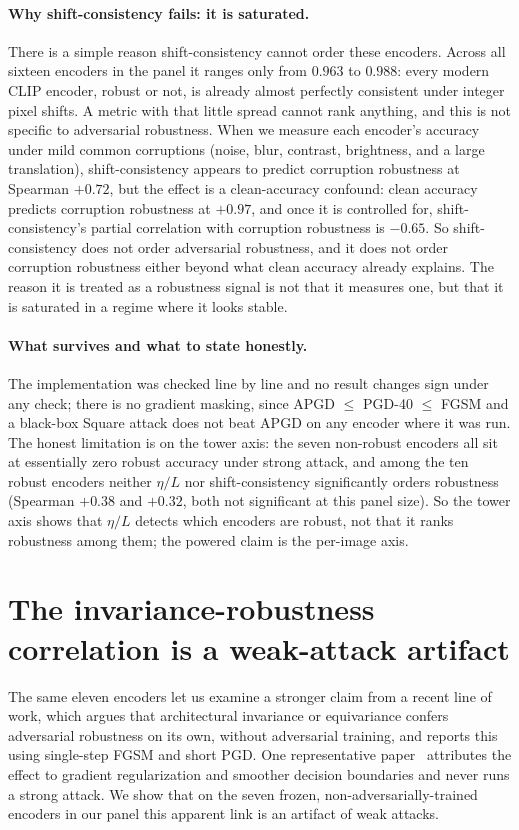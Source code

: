 \documentclass{article}
\newcommand{\etaL}{\ensuremath{\eta/L}}
\begin{document}
\paragraph{Why shift-consistency fails: it is saturated.}
There is a simple reason shift-consistency cannot order these encoders. Across all sixteen encoders in
the panel it ranges only from $0.963$ to $0.988$: every modern CLIP encoder, robust or not, is already
almost perfectly consistent under integer pixel shifts. A metric with that little spread cannot rank
anything, and this is not specific to adversarial robustness. When we measure each encoder's accuracy
under mild common corruptions (noise, blur, contrast, brightness, and a large translation),
shift-consistency appears to predict corruption robustness at Spearman $+0.72$, but the effect is a
clean-accuracy confound: clean accuracy predicts corruption robustness at $+0.97$, and once it is
controlled for, shift-consistency's partial correlation with corruption robustness is $-0.65$. So
shift-consistency does not order adversarial robustness, and it does not order corruption robustness
either beyond what clean accuracy already explains. The reason it is treated as a robustness signal is
not that it measures one, but that it is saturated in a regime where it looks stable.

\paragraph{What survives and what to state honestly.}
The implementation was checked line by line and no result changes sign under any check; there is no
gradient masking, since APGD $\leq$ PGD-40 $\leq$ FGSM and a black-box Square attack does not beat APGD
on any encoder where it was run. The honest limitation is on the tower axis: the seven non-robust
encoders all sit at essentially zero robust accuracy under strong attack, and among the ten robust
encoders neither \etaL{} nor shift-consistency significantly orders robustness (Spearman $+0.38$ and
$+0.32$, both not significant at this panel size). So the tower axis shows that \etaL{} detects which
encoders are robust, not that it ranks robustness among them; the powered claim is the per-image axis.

\section{The invariance-robustness correlation is a weak-attack artifact}
\label{sec:weakattack}
The same eleven encoders let us examine a stronger claim from a recent line of work, which argues that
architectural invariance or equivariance confers adversarial robustness on its own, without adversarial
training, and reports this using single-step FGSM and short PGD. One representative paper~\citep{equivariance}
attributes the effect to gradient regularization and smoother decision boundaries and never runs a
strong attack. We show that on the seven frozen, non-adversarially-trained encoders in our panel this
apparent link is an artifact of weak attacks.
\end{document}
